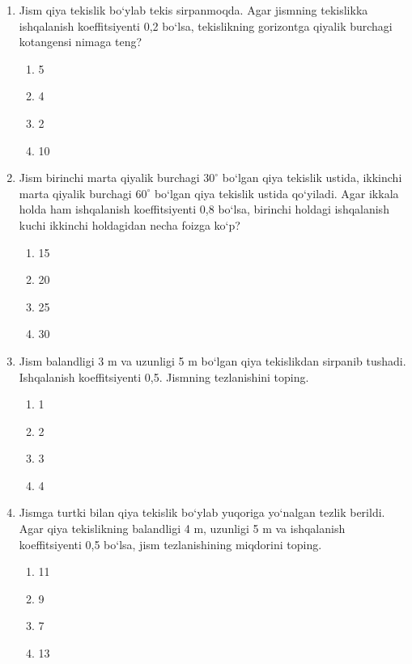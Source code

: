 \begin{enumerate}

\item Jism qiya tekislik bo‘ylab tekis sirpanmoqda.
Agar jismning tekislikka ishqalanish koeffitsiyenti 0,2 bo‘lsa,
tekislikning gorizontga qiyalik burchagi kotangensi nimaga teng?

\begin{enumerate}[label=\Alph*)]
\item 5
\item 4
\item 2
\item 10
\end{enumerate}

\item Jism birinchi marta qiyalik burchagi $30^\circ$ bo‘lgan
qiya tekislik ustida, ikkinchi marta qiyalik burchagi
$60^\circ$ bo‘lgan qiya tekislik ustida qo‘yiladi.
Agar ikkala holda ham ishqalanish koeffitsiyenti 0,8 bo‘lsa,
birinchi holdagi ishqalanish kuchi ikkinchi holdagidan
necha foizga ko‘p?

\begin{enumerate}[label=\Alph*)]
\item 15
\item 20
\item 25
\item 30
\end{enumerate}

\item Jism balandligi 3 m va uzunligi 5 m bo‘lgan
qiya tekislikdan sirpanib tushadi.
Ishqalanish koeffitsiyenti 0,5.
Jismning tezlanishini toping.

\begin{enumerate}[label=\Alph*)]
\item 1
\item 2
\item 3
\item 4
\end{enumerate}

\item Jismga turtki bilan qiya tekislik bo‘ylab yuqoriga
yo‘nalgan tezlik berildi.
Agar qiya tekislikning balandligi 4 m,
uzunligi 5 m va ishqalanish koeffitsiyenti 0,5 bo‘lsa,
jism tezlanishining miqdorini toping.

\begin{enumerate}[label=\Alph*)]
\item 11
\item 9
\item 7
\item 13
\end{enumerate}


\end{enumerate}
